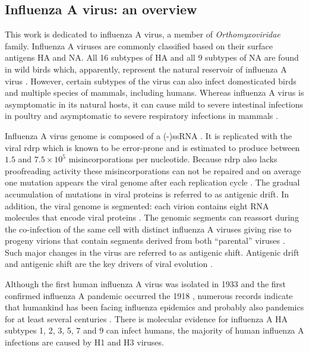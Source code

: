 \subsection{Influenza A virus: an overview}
	
	This work is dedicated to influenza A virus, a member of  \textit{Orthomyxoviridae} family. Influenza A viruses are commonly classified based on their surface antigens \gls{HA} and \gls{NA}. All 16 subtypes of \gls{HA} and all 9 subtypes of \gls{NA} are found in wild birds which, apparently, represent the natural reservoir of influenza A virus \parencite{Stallknecht2007}. However, certain subtypes of the virus can also infect domesticated birds and multiple species of mammals, including humans. Whereas influenza A virus is asymptomatic in its natural hosts, it can cause mild to severe intestinal infections in poultry and asymptomatic to severe respiratory infections in mammals \parencite{Webster1992a}. 
	
	Influenza A virus genome is composed of a \gls{(-)ssRNA} \parencite{Palese1977}. It is replicated with the viral \gls{rdrp} which is known to be error-prone and is estimated to produce between $1.5$ and $7.5\times10^5$ misincorporations per nucleotide. Because \gls{rdrp} also lacks proofreading activity these misincorporations can not be repaired and on average one mutation appears the viral genome after each replication cycle \parencite{Drake1993, Parvin1986}. The gradual accumulation of mutations in viral proteins is referred to as antigenic drift. In addition, the viral genome is segmented: each virion contains eight RNA molecules that encode viral proteins \parencite{McGeoch1976}. The genomic segments can reassort during the co-infection of the same cell with distinct influenza A viruses giving rise to progeny virions that contain segments derived from both ``parental'' viruses \parencite{Desselberger1978}. Such major changes in the virus are referred to as antigenic shift. Antigenic drift and antigenic shift are the key drivers of viral evolution \parencite{Forrest2010}.
		
	Although the first human influenza A virus was isolated in 1933 \parencite{Smith1933} and the first confirmed influenza A pandemic occurred the 1918 \parencite{Taubenberger1997}, numerous records indicate that humankind has been facing influenza epidemics and probably also pandemics for at least several centuries \parencite{Potter2001}. There is molecular evidence for influenza A \gls{HA} subtypes 1, 2, 3, 5, 7 and 9 can infect humans, the  majority of human influenza A infections are caused by H1 and H3 viruses.
	

